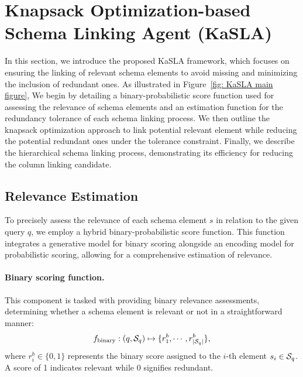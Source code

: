 \section{Knapsack Optimization-based Schema Linking Agent (KaSLA)} \label{sec:Knapsack Optimization-based Schema Linking Agent (KaSLA}

In this section, we introduce the proposed KaSLA framework, which focuses on ensuring the linking of relevant schema elements to avoid missing and minimizing the inclusion of redundant ones. As illustrated in Figure~\ref{fig: KaSLA main figure}, We begin by detailing a binary-probabilistic score function used for assessing the relevance of schema elements and an estimation function for the redundancy tolerance of each schema linking process. We then outline the knapsack optimization approach to link potential relevant element while reducing the potential redundant ones under the tolerance constraint. Finally, we describe the hierarchical schema linking process, demonstrating its efficiency for reducing the column linking candidate.

\subsection{Relevance Estimation}\label{sec:Relevance Estimation}
To precisely assess the relevance of each schema element $s$ in relation to the given query $q$, we employ a hybrid binary-probabilistic score function. This function integrates a generative model for binary scoring alongside an encoding model for probabilistic scoring, allowing for a comprehensive estimation of relevance.

\paragraph{Binary scoring function.}
This component is tasked with providing binary relevance assessments, determining whether a schema element is relevant or not in a straightforward manner:
\begin{equation}
f_{\text{binary}}: (q, {\mathcal{S}}_q) \mapsto \{r^b_1, \cdots, r^b_{|{\mathcal{S}}_q|}\},
\end{equation}
where $r^b_i \in \{0, 1\}$ represents the binary score assigned to the $i$-th element $s_i \in {\mathcal{S}}_q$. A score of 1 indicates relevant while 0 signifies redundant.

